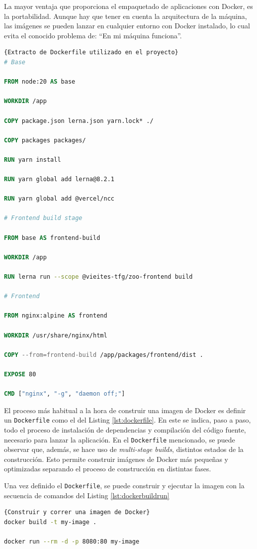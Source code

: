 La mayor ventaja que proporciona el empaquetado de aplicaciones con Docker, es la portabilidad. Aunque hay que tener en cuenta la arquitectura de la máquina, las imágenes se pueden lanzar en cualquier entorno con Docker instalado, lo cual evita el conocido problema de: ``En mi máquina funciona''.

\begin{lstlisting}[language=Dockerfile,label=lst:dockerfile]{Extracto de Dockerfile utilizado en el proyecto}
# Base

FROM node:20 AS base

WORKDIR /app

COPY package.json lerna.json yarn.lock* ./

COPY packages packages/

RUN yarn install

RUN yarn global add lerna@8.2.1

RUN yarn global add @vercel/ncc

# Frontend build stage

FROM base AS frontend-build

WORKDIR /app

RUN lerna run --scope @vieites-tfg/zoo-frontend build 

# Frontend

FROM nginx:alpine AS frontend

WORKDIR /usr/share/nginx/html

COPY --from=frontend-build /app/packages/frontend/dist .

EXPOSE 80

CMD ["nginx", "-g", "daemon off;"]
\end{lstlisting}

El proceso más habitual a la hora de construir una imagen de Docker es definir un \texttt{Dockerfile} como el del Listing \ref{lst:dockerfile}. En este se indica, paso a paso, todo el proceso de instalación de dependencias y compilación del código fuente, necesario para lanzar la aplicación. En el \texttt{Dockerfile} mencionado, se puede observar que, además, se hace uso de \textit{multi-stage builds}, distintos estados de la construcción. Esto permite construir imágenes de Docker más pequeñas y optimizadas separando el proceso de construcción en distintas fases.

Una vez definido el \texttt{Dockerfile}, se puede construir y ejecutar la imagen con la secuencia de comandos del Listing \ref{lst:dockerbuildrun}

\begin{lstlisting}[language=bash,label=lst:dockerbuildrun]{Construir y correr una imagen de Docker}
docker build -t my-image .

docker run --rm -d -p 8080:80 my-image
\end{lstlisting}

